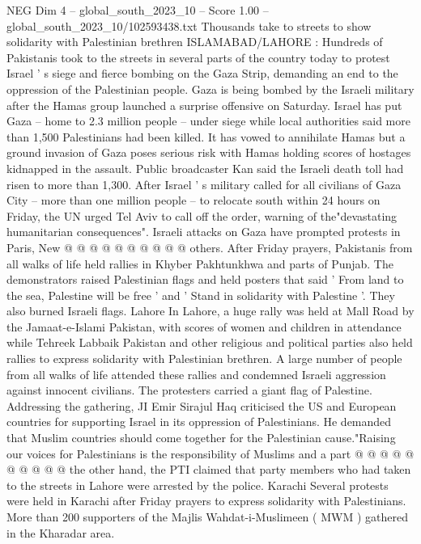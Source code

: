 \begin{textsample}{NEG Dim 4 – global\_south\_2023\_10 – Score 1.00 – global\_south\_2023\_10/102593438.txt}  \label{ex:f4_neg_023}
Thousands take to streets to show solidarity with Palestinian brethren ISLAMABAD/LAHORE : Hundreds of Pakistanis took to the streets in several parts of the country today to protest Israel ' s siege and fierce bombing on the Gaza Strip, demanding an end to the oppression of the Palestinian people.
Gaza is being bombed by the Israeli military after the Hamas group launched a surprise offensive on Saturday.
Israel has put Gaza -- home to 2.3 million people -- under siege while local authorities said more than 1,500 Palestinians had been killed.
It has vowed to annihilate Hamas but a ground invasion of Gaza poses serious risk with Hamas holding scores of hostages kidnapped in the assault.
Public broadcaster Kan said the Israeli death toll had risen to more than 1,300.
After Israel ' s military called for all civilians of Gaza City -- more than one million people -- to relocate south within 24 hours on Friday, the UN urged Tel Aviv to call off the order, warning of the"devastating humanitarian consequences".
Israeli attacks on Gaza have prompted protests in Paris, New @ @ @ @ @ @ @ @ @ @ others.
After Friday prayers, Pakistanis from all walks of life held rallies in Khyber Pakhtunkhwa and parts of Punjab.
The demonstrators raised Palestinian flags and held posters that said ' From land to the sea, Palestine will be free ' and ' Stand in solidarity with Palestine '.
They also burned Israeli flags.
Lahore In Lahore, a huge rally was held at Mall Road by the Jamaat-e-Islami Pakistan, with scores of women and children in attendance while Tehreek Labbaik Pakistan and other religious and political parties also held rallies to express solidarity with Palestinian brethren.
A large number of people from all walks of life attended these rallies and condemned Israeli aggression against innocent civilians.
The protesters carried a giant flag of Palestine.
Addressing the gathering, JI Emir Sirajul Haq criticised the US and European countries for supporting Israel in its oppression of Palestinians.
He demanded that Muslim countries should come together for the Palestinian cause."Raising our voices for Palestinians is the responsibility of Muslims and a part @ @ @ @ @ @ @ @ @ @ the other hand, the PTI claimed that party members who had taken to the streets in Lahore were arrested by the police.
Karachi Several protests were held in Karachi after Friday prayers to express solidarity with Palestinians.
More than 200 supporters of the Majlis Wahdat-i-Muslimeen ( MWM ) gathered in the Kharadar area.

\end{textsample}

